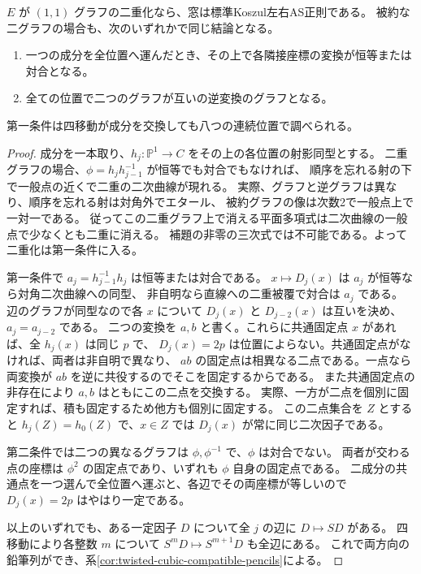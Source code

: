 \begin{theorem}\label{thm:doubled-binary-pencils}
$E$ が $(1,1)$ グラフの二重化なら、窓は標準Koszul左右AS正則である。
被約な二グラフの場合も、次のいずれかで同じ結論となる。
\begin{enumerate}
\item 一つの成分を全位置へ運んだとき、その上で各隣接座標の変換が恒等または対合となる。
\item 全ての位置で二つのグラフが互いの逆変換のグラフとなる。
\end{enumerate}
第一条件は四移動が成分を交換しても八つの連続位置で調べられる。
\end{theorem}
\begin{proof}
成分を一本取り、$h_j:\mathbb P^1\to C$ をその上の各位置の射影同型とする。
二重グラフの場合、$\phi=h_jh_{j-1}^{-1}$ が恒等でも対合でもなければ、
順序を忘れる射の下で一般点の近くで二重の二次曲線が現れる。
実際、グラフと逆グラフは異なり、順序を忘れる射は対角外でエタール、
被約グラフの像は次数2で一般点上で一対一である。
従ってこの二重グラフ上で消える平面多項式は二次曲線の一般点で少なくとも二重に消える。
補題の非零の三次式では不可能である。よって二重化は第一条件に入る。

第一条件で $a_j=h_{j-1}^{-1}h_j$ は恒等または対合である。
$x\mapsto D_j(x)$ は $a_j$ が恒等なら対角二次曲線への同型、
非自明なら直線への二重被覆で対合は $a_j$ である。
辺のグラフが同型なので各 $x$ について $D_j(x)$ と $D_{j-2}(x)$ は互いを決め、$a_j=a_{j-2}$ である。
二つの変換を $a,b$ と書く。これらに共通固定点 $x$ があれば、全 $h_j(x)$ は同じ $p$ で、
$D_j(x)=2p$ は位置によらない。共通固定点がなければ、両者は非自明で異なり、
$ab$ の固定点は相異なる二点である。一点なら両変換が $ab$ を逆に共役するのでそこを固定するからである。
また共通固定点の非存在により $a,b$ はともにこの二点を交換する。
実際、一方が二点を個別に固定すれば、積も固定するため他方も個別に固定する。
この二点集合を $Z$ とすると $h_j(Z)=h_0(Z)$ で、$x\in Z$ では $D_j(x)$ が常に同じ二次因子である。

第二条件では二つの異なるグラフは $\phi,\phi^{-1}$ で、$\phi$ は対合でない。
両者が交わる点の座標は $\phi^2$ の固定点であり、いずれも $\phi$ 自身の固定点である。
二成分の共通点を一つ選んで全位置へ運ぶと、各辺でその両座標が等しいので $D_j(x)=2p$ はやはり一定である。

以上のいずれでも、ある一定因子 $D$ について全 $j$ の辺に $D\mapsto SD$ がある。
四移動により各整数 $m$ について $S^mD\mapsto S^{m+1}D$ も全辺にある。
これで両方向の鉛筆列ができ、系\ref{cor:twisted-cubic-compatible-pencils}による。
\end{proof}

